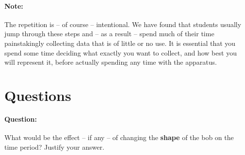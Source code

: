 \paragraph{Note:} The repetition is -- of course -- intentional. We have found that students usually jump through these steps and -- as a result -- spend much of their time painstakingly collecting data that is of little or no use. It is essential that you spend some time deciding what exactly you want to collect, and how best you will represent it, before actually spending any time with the apparatus.



\section{Questions}

\paragraph{Question: } What would be the effect -- if any -- of changing the \textbf{shape} of the bob on the time period? Justify your answer.